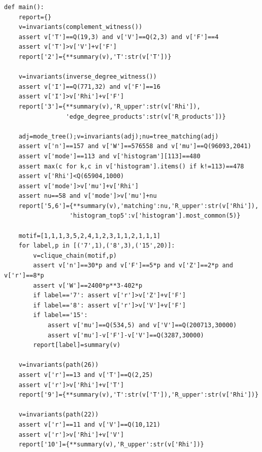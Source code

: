 \documentclass[11pt,a4paper]{article}
\theoremstyle{remark}\newtheorem{remark}[theorem]{Remark}
\begin{document}
\begin{lstlisting}
def main():
    report={}
    v=invariants(complement_witness())
    assert v['T']==Q(19,3) and v['V']==Q(2,3) and v['F']==4
    assert v['T']>v['V']+v['F']
    report['2']={**summary(v),'T':str(v['T'])}

    v=invariants(inverse_degree_witness())
    assert v['I']==Q(771,32) and v['F']==16
    assert v['I']>v['Rhi']+v['F']
    report['3']={**summary(v),'R_upper':str(v['Rhi']),
                 'edge_degree_products':str(v['R_products'])}

    adj=mode_tree();v=invariants(adj);nu=tree_matching(adj)
    assert v['n']==157 and v['W']==576558 and v['mu']==Q(96093,2041)
    assert v['mode']==113 and v['histogram'][113]==480
    assert max(c for k,c in v['histogram'].items() if k!=113)==478
    assert v['Rhi']<Q(65904,1000)
    assert v['mode']>v['mu']+v['Rhi']
    assert nu==58 and v['mode']>v['mu']+nu
    report['5,6']={**summary(v),'matching':nu,'R_upper':str(v['Rhi']),
                  'histogram_top5':v['histogram'].most_common(5)}

    motif=[1,1,1,3,5,2,4,1,2,3,1,1,2,1,1,1]
    for label,p in [('7',1),('8',3),('15',20)]:
        v=clique_chain(motif,p)
        assert v['n']==30*p and v['F']==5*p and v['Z']==2*p and v['r']==8*p
        assert v['W']==2400*p**3-402*p
        if label=='7': assert v['r']>v['Z']+v['F']
        if label=='8': assert v['r']>v['V']+v['F']
        if label=='15':
            assert v['mu']==Q(534,5) and v['V']==Q(200713,30000)
            assert v['mu']-v['F']-v['V']==Q(3287,30000)
        report[label]=summary(v)

    v=invariants(path(26))
    assert v['r']==13 and v['T']==Q(2,25)
    assert v['r']>v['Rhi']+v['T']
    report['9']={**summary(v),'T':str(v['T']),'R_upper':str(v['Rhi'])}

    v=invariants(path(22))
    assert v['r']==11 and v['V']==Q(10,121)
    assert v['r']>v['Rhi']+v['V']
    report['10']={**summary(v),'R_upper':str(v['Rhi'])}


\end{lstlisting}
\end{document}
